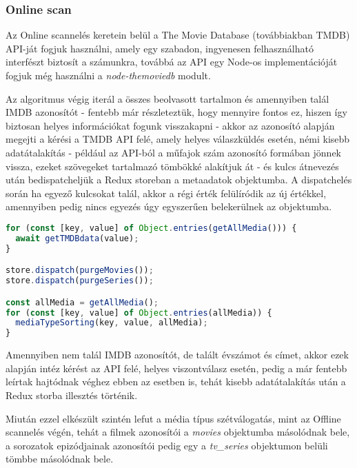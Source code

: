 \subsubsection{Online scan}
Az Online scannelés keretein belül a The Movie Database\cite{tmdb} (továbbiakban TMDB) API-ját fogjuk használni, amely egy szabadon, ingyenesen felhasználható interfészt biztosít a számunkra, továbbá az API egy Node-os implementációját fogjuk még használni a {\it node-themoviedb } modult\cite{node-themoviedb}.

Az algoritmus végig iterál a összes beolvasott tartalmon és amennyiben talál IMDB azonosítót - fentebb már részleteztük, hogy mennyire fontos ez, hiszen így biztosan helyes információkat fogunk visszakapni - akkor az azonosító alapján megejti a kérési a TMDB API felé, amely helyes válaszküldés esetén, némi kisebb adatátalakítás - például az API-ból a műfajok szám azonosító formában jönnek vissza, ezeket szövegeket tartalmazó tömbökké alakítjuk át - és kulcs átnevezés után bedispatcheljük a Redux storeban a metaadatok objektumba. A dispatchelés során ha egyező kulcsokat talál, akkor a régi érték felülíródik az új értékkel, amennyiben pedig nincs egyezés úgy egyszerűen belekerülnek az objektumba.

\begin{lstlisting}[language={ts}]
for (const [key, value] of Object.entries(getAllMedia())) {
  await getTMDBdata(value);
}

store.dispatch(purgeMovies());
store.dispatch(purgeSeries());

const allMedia = getAllMedia();
for (const [key, value] of Object.entries(allMedia)) {
  mediaTypeSorting(key, value, allMedia);
}
\end{lstlisting}

Amennyiben nem talál IMDB azonosítót, de talált évszámot és címet, akkor ezek alapján intéz kérést az API felé, helyes viszontválasz esetén, pedig a már fentebb leírtak hajtódnak véghez ebben az esetben is, tehát kisebb adatátalakítás után a Redux storba illesztés történik.

Miután ezzel elkészült szintén lefut a média típus szétválogatás, mint az Offline scannelés végén, tehát a filmek azonosítói a {\it movies } objektumba másolódnak bele, a sorozatok epizódjainak azonosítói pedig egy a {\it tv\_series } objektumon belüli tömbbe másolódnak bele.

